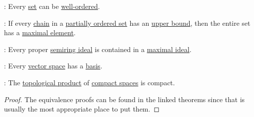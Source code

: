 \begin{theorem}
\begin{thmenum}[resume=thm:axiom_of_choice_equivalences]
     : Every \hyperref[def:set]{set} can be \hyperref[def:well_ordered_set]{well-ordered}.

     : If every \hyperref[def:partial_order_chain]{chain} in a \hyperref[def:partially_ordered_set]{partially ordered set} has an \hyperref[def:extremal_points/bounds]{upper bound}, then the entire set has a \hyperref[def:extremal_points/maximal_and_minimal_element]{maximal element}.

     : Every proper \hyperref[def:semiring_ideal]{semiring ideal} is contained in a \hyperref[def:semiring_ideal/maximal]{maximal ideal}.

     : Every \hyperref[def:vector_space]{vector space} has a \hyperref[def:hamel_basis]{basis}.

     : The \hyperref[def:topological_product]{topological product} of \hyperref[def:compact_space]{compact spaces} is compact.
  \end{thmenum}
\end{theorem}
\begin{proof}
  The equivalence proofs can be found in the linked theorems since that is usually the most appropriate place to put them.
\end{proof}

